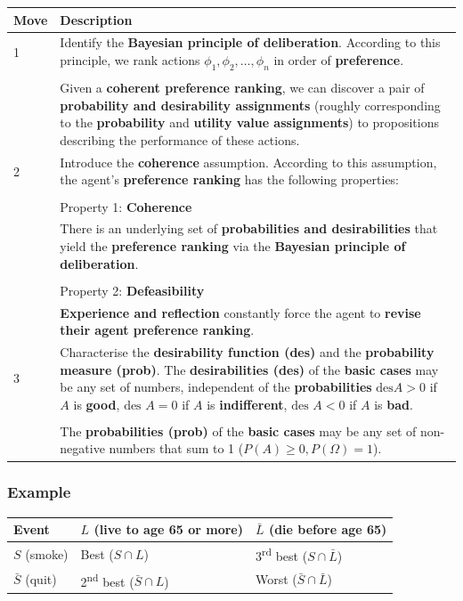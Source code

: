 \documentclass[11pt]{article}
\begin{document}
\begin{center}
\begin{tabular}{|m{2em}|m{28em}|}
\hline
Move & Description\\
\hline
1 & Identify the \textbf{Bayesian principle of deliberation}. According to this principle, we rank actions \(\phi_1, \phi_2, \ldots, \phi_n\) in order of \textbf{preference}.\\
 & \\
 & Given a \textbf{coherent preference ranking}, we can discover a pair of \textbf{probability and desirability assignments} (roughly corresponding to the \textbf{probability} and \textbf{utility value assignments}) to propositions describing the performance of these actions.\\
\hline
2 & Introduce the \textbf{coherence} assumption. According to this assumption, the agent's \textbf{preference ranking} has the following properties:\\
 & \\
 & Property 1: \textbf{Coherence}\\
 & There is an underlying set of \textbf{probabilities and desirabilities} that yield the \textbf{preference ranking} via the \textbf{Bayesian principle of deliberation}.\\
 & \\
 & Property 2: \textbf{Defeasibility}\\
 & \textbf{Experience and reflection} constantly force the agent to \textbf{revise their agent preference ranking}.\\
\hline
3 & Characterise the \textbf{desirability function (des)} and the \textbf{probability measure (prob)}. The \textbf{desirabilities (des)} of the \textbf{basic cases} may be any set of numbers, independent of the \textbf{probabilities} \(\text{des} A > 0\) if \(A\) is \textbf{good}, \(\text{des } A = 0\) if \(A\) is \textbf{indifferent}, \(\text{des } A < 0\) if \(A\) is \textbf{bad}.\\
 & \\
 & The \textbf{probabilities (prob)} of the \textbf{basic cases} may be any set of non-negative numbers that sum to 1 (\(P(A) \ge 0, P(\Omega) = 1\)).\\
\hline
\end{tabular}
\end{center}
\subsubsection{Example}
\label{sec:org8ad1023}
\begin{center}
\begin{tabular}{l|l|l}
Event & \(L\) (live to age 65 or more) & \(\bar{L}\) (die before age 65)\\
\hline
\(S\) (smoke) & Best (\(S \cap L\)) & 3\textsuperscript{rd} best (\(S \cap \bar{L}\))\\
\hline
\(\bar{S}\) (quit) & 2\textsuperscript{nd} best (\(\bar{S} \cap L\)) & Worst (\(\bar{S} \cap \bar{L}\))\\
\end{tabular}
\end{center}
\end{document}
